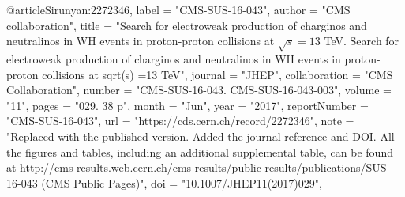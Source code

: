 @article{Sirunyan:2272346,
      label          = "CMS-SUS-16-043",
      author        = "{CMS collaboration}",
      title         = "{Search for electroweak production of charginos and
                       neutralinos in WH events in proton-proton collisions at $
                       \sqrt{s}=13 $ TeV. Search for electroweak production of
                       charginos and neutralinos in WH events in proton-proton
                       collisions at sqrt(s) =13 TeV}",
      journal       = "JHEP",
      collaboration = "CMS Collaboration",
      number        = "CMS-SUS-16-043. CMS-SUS-16-043-003",
      volume        = "11",
      pages         = "029. 38 p",
      month         = "Jun",
      year          = "2017",
      reportNumber  = "CMS-SUS-16-043",
      url           = "https://cds.cern.ch/record/2272346",
      note          = "Replaced with the published version. Added the journal
                       reference and DOI. All the figures and tables, including an
                       additional supplemental table, can be found at
                       http://cms-results.web.cern.ch/cms-results/public-results/publications/SUS-16-043
                       (CMS Public Pages)",
      doi           = "10.1007/JHEP11(2017)029",
}

